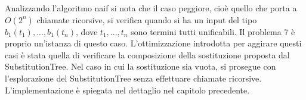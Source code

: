 \documentclass[./main.tex]{subfiles}
\begin{document}
Analizzando l'algoritmo naif si nota che il caso peggiore, cioè quello che porta a $O(2^n)$ chiamate ricorsive,
 si verifica quando si ha un input del tipo $b_1(t_1), ..., b_1(t_n)$,
dove $t_1, ..., t_n$ sono termini tutti unificabili. 
Il problema 7 è proprio un'istanza di questo caso. 
L'ottimizzazione introdotta per aggirare questi casi 
è stata quella di verificare la composizione della sostituzione proposta dal SubstitutionTree.
Nel caso in cui la sostituzione sia vuota, si prosegue con l'esplorazione del SubstitutionTree senza effettuare chiamate ricorsive.
L'implementazione è spiegata nel dettaglio nel capitolo precedente.
\end{document}
